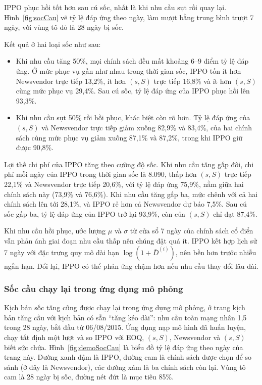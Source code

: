IPPO phục hồi tốt hơn sau cú sốc, nhất là khi nhu cầu sụt rồi quay lại. Hình~\ref{fig:socCau} vẽ tỷ lệ đáp ứng theo ngày, làm mượt bằng trung bình trượt 7 ngày, với vùng tô đỏ là 28 ngày bị sốc.

Kết quả ở hai loại sốc như sau:
\begin{itemize}
    \item Khi nhu cầu tăng 50\%, mọi chính sách đều mất khoảng 6--9 điểm tỷ lệ đáp ứng. Ở mức phục vụ gần như nhau trong thời gian sốc, IPPO tốn ít hơn Newsvendor trực tiếp 13,2\%, ít hơn $(s,S)$ trực tiếp 16,8\% và ít hơn $(s,S)$ cùng mức phục vụ 29,4\%. Sau cú sốc, tỷ lệ đáp ứng của IPPO phục hồi lên 93,3\%.
    \item Khi nhu cầu sụt 50\% rồi hồi phục, khác biệt còn rõ hơn. Tỷ lệ đáp ứng của $(s,S)$ và Newsvendor trực tiếp giảm xuống 82,9\% và 83,4\%, của hai chính sách cùng mức phục vụ giảm xuống 87,1\% và 87,2\%, trong khi IPPO giữ được 90,8\%.
\end{itemize}

Lợi thế chi phí của IPPO tăng theo cường độ sốc. Khi nhu cầu tăng gấp đôi, chi phí mỗi ngày của IPPO trong thời gian sốc là 8.090, thấp hơn $(s,S)$ trực tiếp 22,1\% và Newsvendor trực tiếp 20,6\%, với tỷ lệ đáp ứng 75,9\%, nằm giữa hai chính sách này (73,9\% và 76,6\%). Khi nhu cầu tăng gấp ba, mức chênh với cả hai chính sách lên tới 28,1\%, và IPPO rẻ hơn cả Newsvendor dự báo 7,5\%. Sau cú sốc gấp ba, tỷ lệ đáp ứng của IPPO trở lại 93,9\%, còn của $(s,S)$ chỉ đạt 87,4\%.

Khi nhu cầu hồi phục, ước lượng $\mu$ và $\sigma$ từ cửa sổ 7 ngày của chính sách cổ điển vẫn phản ánh giai đoạn nhu cầu thấp nên chúng đặt quá ít. IPPO kết hợp lịch sử 7 ngày với đặc trưng quy mô dài hạn $\log(1 + \bar{D}^{(i)})$, nên bền hơn trước nhiễu ngắn hạn. Đổi lại, IPPO có thể phản ứng chậm hơn nếu nhu cầu thay đổi lâu dài.

\subsubsection{Sốc cầu chạy lại trong ứng dụng mô phỏng}

Kịch bản sốc tăng cũng được chạy lại trong ứng dụng mô phỏng, ở trang kịch bản tăng cầu với kịch bản có sẵn ``tăng kéo dài'': nhu cầu toàn mạng nhân 1,5 trong 28 ngày, bắt đầu từ 06/08/2015. Ứng dụng nạp mô hình đã huấn luyện, chạy tất định một lượt và so IPPO với EOQ, $(s,S)$, Newsvendor và $(s,S)$ biết sức chứa. Hình~\ref{fig:demoSocCau} là biểu đồ tỷ lệ đáp ứng theo ngày của trang này. Đường xanh đậm là IPPO, đường cam là chính sách được chọn để so sánh (ở đây là Newsvendor), các đường xám là ba chính sách còn lại. Vùng tô cam là 28 ngày bị sốc, đường nét đứt là mục tiêu 85\%.

